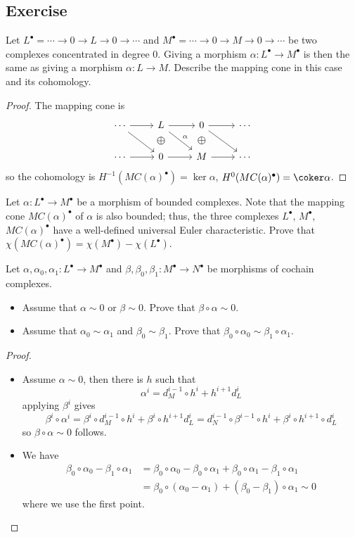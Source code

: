 \subsection{Exercise}
\begin{exercise}
Let $L^\bullet=\cdots\to0\to L\to0\to\cdots$ and $M^\bullet=\cdots\to0\to M\to0\to\cdots$ be two
complexes concentrated in degree $0$. Giving a morphism $\alpha:L^\bullet\to M^\bullet$ is then the
same as giving a morphism $\alpha:L\to M$. Describe the mapping cone in this case and its cohomology.
\end{exercise}
\begin{proof}
The mapping cone is 
\[\begin{tikzcd}
\cdots\ar[rd]\ar[r]&L\ar[draw=none]{d}[name=X, anchor=center,scale=1.5]{\oplus}\ar[r]\ar[rd,"\alpha"]&0\ar[draw=none]{d}[name=X, anchor=center,scale=1.5]{\oplus}\ar[rd]\ar[r]&\cdots\\
\cdots\ar[r]&0\ar[r]&M\ar[r]&\cdots
\end{tikzcd}\]
so the cohomology is $H^{-1}(MC(\alpha)^\bullet)=\ker\alpha$, $H^0(MC(\alpha)^\bullet)=\coker\alpha$.
\end{proof}
\begin{exercise}
Let $\alpha:L^\bullet\to M^\bullet$ be a morphism of bounded complexes. Note that the mapping cone $MC(\alpha)^\bullet$ of $\alpha$ is also bounded; thus, the three complexes $L^\bullet$, $M^\bullet$, $MC(\alpha)^\bullet$ have a well-defined universal Euler characteristic. Prove that $\chi(MC(\alpha)^\bullet)=\chi(M^\bullet)-\chi(L^\bullet)$.
\end{exercise}
\begin{exercise}\label{homotopy prop}
Let $\alpha,\alpha_0,\alpha_1:L^\bullet\to M^\bullet$ and $\beta,\beta_0,\beta_1:M^\bullet\to N^\bullet$ be morphisms of cochain complexes.
\begin{itemize}
\item Assume that $\alpha\sim 0$ or $\beta\sim0$. Prove that $\beta\circ\alpha\sim 0$.
\item Assume that $\alpha_0\sim\alpha_1$ and $\beta_0\sim\beta_1$. Prove that $\beta_0\circ\alpha_0\sim\beta_1\circ\alpha_1$.
\end{itemize}
\end{exercise}
\begin{proof}
\mbox{}
\begin{itemize}
\item Assume $\alpha\sim0$, then there is $h$ such that
\[\alpha^i=d_M^{i-1}\circ h^i+h^{i+1}d_L^i\]
applying $\beta^i$ gives
\[\beta^i\circ\alpha^i=\beta^i\circ d_M^{i-1}\circ h^i+\beta^i\circ h^{i+1}d_L^i=d_N^{i-1}\circ\beta^{i-1}\circ h^i+\beta^i\circ h^{i+1}\circ d_L^{i}\]
so $\beta\circ\alpha\sim 0$ follows.
\item We have
\begin{align*}
\beta_0\circ\alpha_0-\beta_1\circ\alpha_1&=\beta_0\circ\alpha_0-\beta_0\circ\alpha_1+\beta_0\circ\alpha_1-\beta_1\circ\alpha_1\\
&=\beta_0\circ(\alpha_0-\alpha_1)+(\beta_0-\beta_1)\circ\alpha_1\sim 0
\end{align*}
where we use the first point.
\end{itemize}
\end{proof}
